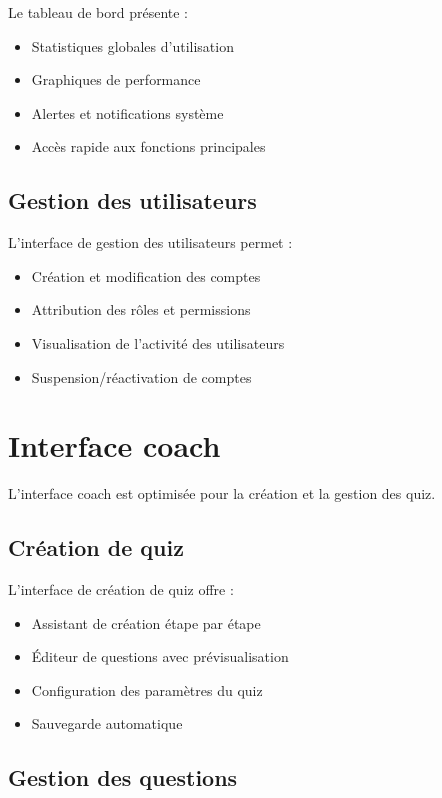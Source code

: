 \documentclass[12pt,a4paper]{report}
\begin{document}
Le tableau de bord présente :

\begin{itemize}
    \item Statistiques globales d'utilisation
    \item Graphiques de performance
    \item Alertes et notifications système
    \item Accès rapide aux fonctions principales
\end{itemize}

\subsection{Gestion des utilisateurs}

L'interface de gestion des utilisateurs permet :

\begin{itemize}
    \item Création et modification des comptes
    \item Attribution des rôles et permissions
    \item Visualisation de l'activité des utilisateurs
    \item Suspension/réactivation de comptes
\end{itemize}

\section{Interface coach}

L'interface coach est optimisée pour la création et la gestion des quiz.

\subsection{Création de quiz}

L'interface de création de quiz offre :

\begin{itemize}
    \item Assistant de création étape par étape
    \item Éditeur de questions avec prévisualisation
    \item Configuration des paramètres du quiz
    \item Sauvegarde automatique
\end{itemize}

\subsection{Gestion des questions}
\end{document}
